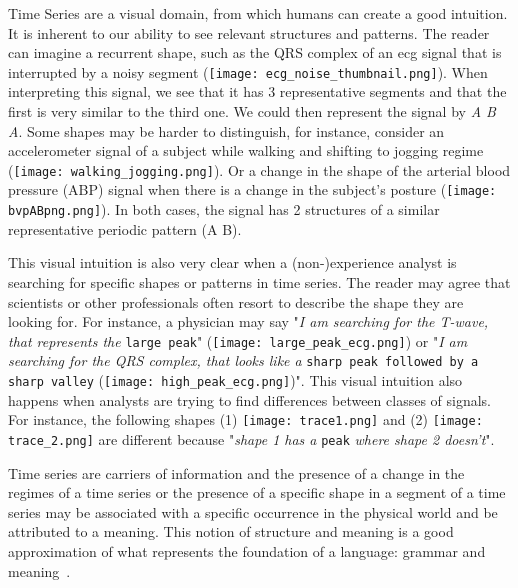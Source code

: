 Time Series are a visual domain, from which humans can create a good intuition. It is inherent to our ability to see relevant structures and patterns. The reader can imagine a recurrent shape, such as the \textcolor{myblue}{QRS complex} of an \gls{ecg} signal that is interrupted by a \textcolor{myred}{noisy} segment (\texttt{[image: ecg\_noise\_thumbnail.png]}). When interpreting this signal, we see that it has 3 representative segments and that the first is very similar to the third one. We could then represent the signal by \textit{\textcolor{myblue}{A} \textcolor{myred}{B} \textcolor{myblue}{A}}. Some shapes may be harder to distinguish, for instance, consider an accelerometer signal of a subject while \textcolor{myblue}{walking} and shifting to \textcolor{mygreen}{jogging} regime (\texttt{[image: walking\_jogging.png]}). Or a change in the shape of the arterial blood pressure (ABP) signal when there is a change in the subject's posture (\texttt{[image: bvpABpng.png]}). In both cases, the signal has 2 structures of a similar representative periodic pattern (\textcolor{myblue}{A} \textcolor{mygreen}{B}).

This visual intuition is also very clear when a (non-)experience analyst is searching for specific shapes or patterns in time series. The reader may agree that scientists or other professionals often resort to describe the shape they are looking for. For instance, a physician may say "\textit{I am searching for the T-wave, that represents the} \texttt{large peak}" (\texttt{[image: large\_peak\_ecg.png]}) or "\textit{I am searching for the QRS complex, that looks like a} \texttt{sharp peak followed by a sharp valley} (\texttt{[image: high\_peak\_ecg.png]})". This visual intuition also happens when analysts are trying to find differences between classes of signals. For instance, the following shapes (1) \texttt{[image: trace1.png]} and (2) \texttt{[image: trace\_2.png]} are different because "\textit{shape 1 has a} \texttt{peak} \textit{where shape 2 doesn't}". 

Time series are carriers of information and the presence of a change in the regimes of a time series or the presence of a specific shape in a segment of a time series may be associated with a specific occurrence in the physical world and be attributed to a meaning. This notion of structure and meaning is a good approximation of what represents the foundation of a language: grammar and meaning~\cite{grammar}.

